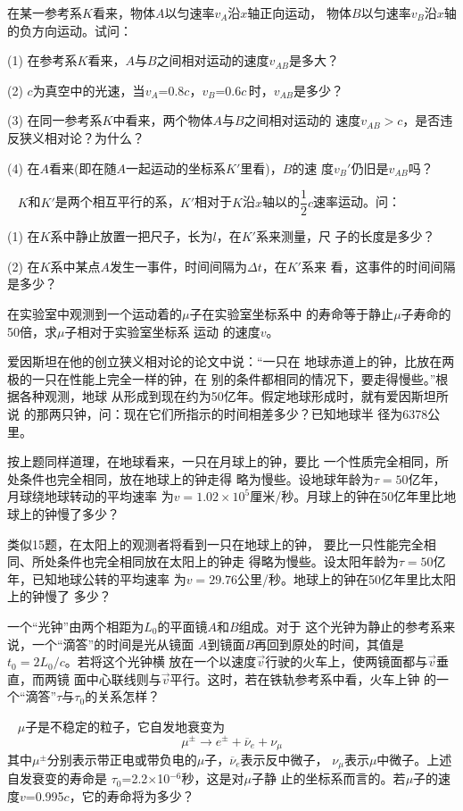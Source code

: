 \begin{exercises}
\exercise 在某一参考系$K$看来，物体$A$以匀速率$v_A$沿$x$轴正向运动，
物体$B$以匀速率$v_B$沿$x$轴的负方向运动。试问：

(1) 在参考系$K$看来，\!$A$与$B$之间相对运动的速度$v_{A\!B}$是多大？

(2) $c$为真空中的光速，当$ v _ { A }$=0.8$ c $，\!$ v _ { B }$=0.6$ c  $\,时，\!$v_{A\!B}$是多少？

(3) 在同一参考系$K$中看来，两个物体$A$与$B$之间相对运动的
速度$ v _ { A B } > c  $，是否违反狭义相对论？为什么？

(4) 在$A$看来(即在随$A$一起运动的坐标系$K'$里看)，$B$的速
度$ v _ B ' $仍旧是$v_{AB}$吗？

\exercise~ $K$和$K'$是两个相互平行的系，$K'$相对于$K$沿$x$轴以的$\dfrac { 1 } { 2 } c $速率运动。问：

(1) 在$K$系中静止放置一把尺子，长为$l$，在$K'$系来测量，尺
子的长度是多少？

(2) 在$K$系中某点$A$发生一事件，时间间隔为$\Delta t$，在$K'$系来
看，这事件的时间间隔是多少？

\exercise 在实验室中观测到一个运动着的$\mu$子在实验室坐标系中
的寿命等于静止$\mu$子寿命的50倍，求$\mu$子相对于实验室坐标系
运动
的速度$v$。

\clearpage
\exercise 爱因斯坦在他的创立狭义相对论的论文中说：“一只在
地球赤道上的钟，比放在两极的一只在性能上完全一样的钟，在
别的条件都相同的情况下，要走得慢些。”根据各种观测，地球
从形成到现在约为50亿年。假定地球形成时，就有爱因斯坦所说
的那两只钟，问：现在它们所指示的时间相差多少？已知地球半
径为6378公里。

\exercise 按上题同样道理，在地球看来，一只在月球上的钟，要比
一个性质完全相同，所处条件也完全相同，放在地球上的钟走得
略为慢些。设地球年龄为$ \tau = 5 0  $亿年，月球绕地球转动的平均速率
为$ v = 1 . 0 2 \times 1 0 ^ { 5 }  $厘米/秒。月球上的钟在50亿年里比地球上的钟慢了多少？

\exercise 类似15题，在太阳上的观测者将看到一只在地球上的钟，
要比一只性能完全相同、所处条件也完全相同放在太阳上的钟走
得略为慢些。设太阳年龄为$ \tau = 5 0  $亿年，已知地球公转的平均速率
为$ v = 2 9 . 7 6  $公里/秒。地球上的钟在50亿年里比太阳上的钟慢了
多少？

\exercise 一个“光钟”由两个相距为$ L _ { 0 }  $的平面镜$A$和$B$组成。对于
这个光钟为静止的参考系来说，一个“滴答”的时间是光从镜面
$A$到镜面$B$再回到原处的时间，其值是$ t _ { 0 } = 2 L _ { 0 }  /c$。若将这个光钟横
放在一个以速度$\vec{v}$行驶的火车上，使两镜面都与$\vec{v}$垂直，而两镜
面中心联线则与$\vec{v}$平行。这时，若在铁轨参考系中看，火车上钟
的一个“滴答”$\tau$与$\tau _ 0$的关系怎样？

\exercise ~ $\mu$子是不稳定的粒子，它自发地衰变为
\begin{equation*}
    \mu ^ \pm \longrightarrow e ^ \pm + \overline{\nu} _ { e } + \nu _ { \mu }
\end{equation*}
其中$\mu ^ \pm$分别表示带正电或带负电的$\mu$子，$\overline{\nu} _ { e }$表示反中微子，
$\nu _ { \mu}$表示$\mu$中微子。上述自发衰变的寿命是
$ \tau _ { 0 }$=2.2$\times$10$^{-6}$秒，这是对$\mu$子静
止的坐标系而言的。若$\mu$子的速度$ v$=0.995$c$，它的寿命将为多少？
\end{exercises}
